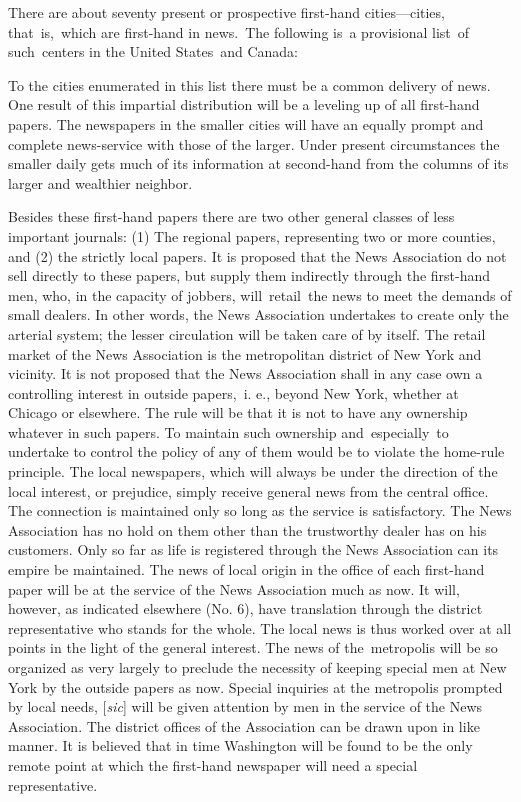 \documentclass[twoside,symmetric,nobib,justified]{tufte-book}
\begin{document}
There are about seventy present or prospective first-hand
cities---cities, that~is,~which are first-hand in news.~The following
is~a provisional list~of such~centers in the United States~and
Canada:~~~

\enlargethispage{\baselineskip}

To the cities enumerated in this list there must be a common delivery of
news. One result of this impartial distribution will be a leveling up of
all first-hand papers. The newspapers in the smaller cities will have an
equally prompt and complete news-service with those of the larger. Under
present circumstances the smaller daily gets much of its information at
second-hand from the columns of its larger and wealthier neighbor.~

Besides these first-hand papers there are two other general classes of
less important journals: (1) The regional papers, representing two or
more counties, and (2) the strictly local papers. It is proposed that
the News Association do not sell directly to these papers, but supply
them indirectly through the first-hand men, who, in the capacity of
jobbers, will~retail~the news to meet the demands of small dealers. In
other words, the News Association undertakes to create only the arterial
system; the lesser circulation will be taken care of by itself. The
retail market of the News Association is the metropolitan district of
New York and vicinity. It is not proposed that the News Association
shall in any case own a controlling interest in outside papers,~i. e.,
beyond New York, whether at Chicago or elsewhere. The rule will be that
it is not to have any ownership whatever in such papers. To maintain
such ownership and~especially~to undertake to control the policy of any
of them would be to violate the home-rule principle. The local
newspapers, which will always be under the direction of the local
interest, or prejudice, simply receive general news from the central
office. The connection is maintained only so long as the service is
satisfactory. The News Association has no hold on them other than the
trustworthy dealer has on his customers. Only so far as life is
registered through the News Association can its empire be maintained.
The news of local origin in the office of each first-hand paper will be
at the service of the News Association much as now. It will, however, as
indicated elsewhere (No. 6), have translation through the district
representative who stands for the whole. The local news is thus worked
over at all points in the light of the general interest. The news of
the~metropolis will be so organized as very largely to preclude the
necessity of keeping special men at New York by the outside papers as
now. Special inquiries at the metropolis prompted by local needs,
{[}\emph{sic}{]} will be given attention by men in the service of the
News Association. The district offices of the Association can be drawn
upon in like manner. It is believed that in time Washington will be
found to be the only remote point at which the first-hand newspaper will
need a special representative.~
\end{document}
